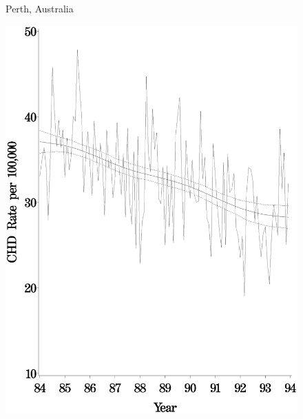 \begin{figure}[!h]
\centerline{Perth, Australia}
	\centerline{
    \includegraphics[scale=0.2]{figures/trend_twostage_perth.eps}
}
\end{figure}
